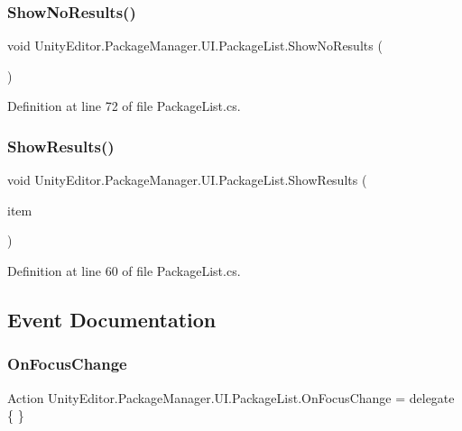 \subsubsection{\texorpdfstring{ShowNoResults()}{ShowNoResults()}}
{\footnotesize\ttfamily void Unity\+Editor.\+Package\+Manager.\+U\+I.\+Package\+List.\+Show\+No\+Results (\begin{DoxyParamCaption}{ }\end{DoxyParamCaption})}



Definition at line 72 of file Package\+List.\+cs.

\mbox{\label{class_unity_editor_1_1_package_manager_1_1_u_i_1_1_package_list_aad7539a4939625a8d07789fa6e6a79e4}} 
\subsubsection{\texorpdfstring{ShowResults()}{ShowResults()}}
{\footnotesize\ttfamily void Unity\+Editor.\+Package\+Manager.\+U\+I.\+Package\+List.\+Show\+Results (\begin{DoxyParamCaption}\item[{\mbox{\hyperlink{class_unity_editor_1_1_package_manager_1_1_u_i_1_1_package_item}{Package\+Item}}}]{item }\end{DoxyParamCaption})}



Definition at line 60 of file Package\+List.\+cs.



\subsection{Event Documentation}
\mbox{\label{class_unity_editor_1_1_package_manager_1_1_u_i_1_1_package_list_a32525f3e31f2562eb8d4ca11639636e9}} 
\subsubsection{\texorpdfstring{OnFocusChange}{OnFocusChange}}
{\footnotesize\ttfamily Action Unity\+Editor.\+Package\+Manager.\+U\+I.\+Package\+List.\+On\+Focus\+Change = delegate \{ \}}



